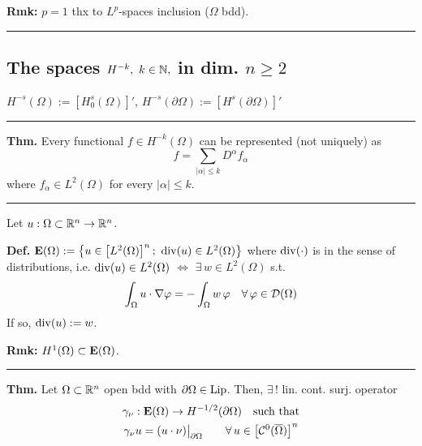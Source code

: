 \smallskip

\textbf{Rmk:} $p=1$ thx to $L^p$-spaces inclusion ($\Omega$ bdd).

\rule{0.31\textwidth}{0.2pt}


\subsection{\color{red}The spaces \texorpdfstring{$H^{-k},\ k\in\mathbb{N},$}{C} in dim. \texorpdfstring{$n\geq 2$}{C}}


$H^{-s}(\Omega):=\left[ H^s_0(\Omega) \right]'$, $H^{-s}(\partial\Omega):=\left[ H^s(\partial\Omega) \right]'$

\rule{0.31\textwidth}{0.2pt}
\smallskip

\textbf{Thm.} Every functional $f\in H^{-k}(\Omega)$ can be represented (not uniquely) as
\begin{equation*}
f=\sum_{|\alpha|\leq k} D^\alpha f_\alpha
\end{equation*}
where $f_\alpha\in L^2(\Omega)$ for every $|\alpha|\leq k$.

\rule{0.31\textwidth}{0.2pt}
\smallskip

Let $u:\Omega\subset\mathbb{R}^n\to\mathbb{R}^n$.

\smallskip

\textbf{Def.} $\mathbf{E}(\Omega):=\left\{ u\in \left[ L^2(\Omega) \right]^n;\ \operatorname{div}(u) \in L^2(\Omega) \right\}$ where $\operatorname{div}(\cdot)$ is in the sense of distributions, i.e. $\operatorname{div}(u)\in L^2(\Omega)$ $\Longleftrightarrow$ $\exists\, w\in L^2(\Omega)$ s.t.
\begin{equation*}
\int_\Omega u\cdot \nabla\varphi=-\int_\Omega w\,\varphi\quad\forall\,\varphi\in\mathcal{D}(\Omega)
\end{equation*}
If so, $\operatorname{div}(u):=w$.

\smallskip

\textbf{Rmk:} $H^1(\Omega)\subset\mathbf{E}(\Omega)$.

\rule{0.31\textwidth}{0.2pt}
\smallskip

\textbf{Thm.} Let $\Omega\subset\mathbb{R}^n$ open bdd with $\partial\Omega\in\operatorname{Lip}$. Then, $\exists\,!$ lin. cont. surj. operator 
\begin{gather*}
\gamma_\nu:\mathbf{E}(\Omega)\to H^{-1/2}(\partial\Omega)\quad\text{such that} \\
\gamma_\nu u=(u\cdot\nu)\big|_{\partial\Omega}\qquad\forall\, u\in\left[\mathcal{C}^0(\overline{\Omega})\right]^n
\end{gather*}

